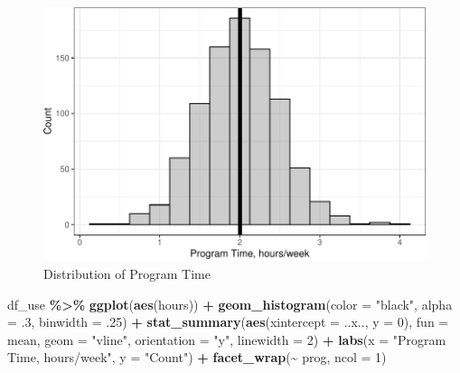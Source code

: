 \documentclass[
]{article}
\newenvironment{Shaded}{\begin{snugshade}}{\end{snugshade}}
\newcommand{\AttributeTok}[1]{\textcolor[rgb]{0.13,0.29,0.53}{#1}}
\newcommand{\DecValTok}[1]{\textcolor[rgb]{0.00,0.00,0.81}{#1}}
\newcommand{\FunctionTok}[1]{\textcolor[rgb]{0.13,0.29,0.53}{\textbf{#1}}}
\newcommand{\NormalTok}[1]{#1}
\newcommand{\SpecialCharTok}[1]{\textcolor[rgb]{0.81,0.36,0.00}{\textbf{#1}}}
\newcommand{\StringTok}[1]{\textcolor[rgb]{0.31,0.60,0.02}{#1}}
\begin{document}
\begin{figure}[hb]

\includegraphics{Appendix_ex_weightloss_files/figure-latex/unnamed-chunk-39-1} \hfill{}

\caption{Distribution of Program Time}\label{fig:unnamed-chunk-39}
\end{figure}

\clearpage

\begin{Shaded}
\begin{Highlighting}[]
\NormalTok{df\_use }\SpecialCharTok{\%\textgreater{}\%} 
  \FunctionTok{ggplot}\NormalTok{(}\FunctionTok{aes}\NormalTok{(hours)) }\SpecialCharTok{+} 
  \FunctionTok{geom\_histogram}\NormalTok{(}\AttributeTok{color =} \StringTok{"black"}\NormalTok{,}
                 \AttributeTok{alpha =}\NormalTok{ .}\DecValTok{3}\NormalTok{,}
                 \AttributeTok{binwidth =}\NormalTok{ .}\DecValTok{25}\NormalTok{) }\SpecialCharTok{+}
  \FunctionTok{stat\_summary}\NormalTok{(}\FunctionTok{aes}\NormalTok{(}\AttributeTok{xintercept =}\NormalTok{ ..x.., }\AttributeTok{y =} \DecValTok{0}\NormalTok{),}
               \AttributeTok{fun =}\NormalTok{ mean,}
               \AttributeTok{geom =} \StringTok{"vline"}\NormalTok{,}
               \AttributeTok{orientation =} \StringTok{"y"}\NormalTok{,}
               \AttributeTok{linewidth =} \DecValTok{2}\NormalTok{) }\SpecialCharTok{+}
  \FunctionTok{labs}\NormalTok{(}\AttributeTok{x =} \StringTok{"Program Time, hours/week"}\NormalTok{,}
       \AttributeTok{y =} \StringTok{"Count"}\NormalTok{) }\SpecialCharTok{+}
  \FunctionTok{facet\_wrap}\NormalTok{(}\SpecialCharTok{\textasciitilde{}}\NormalTok{ prog, }\AttributeTok{ncol =} \DecValTok{1}\NormalTok{)}
\end{Highlighting}
\end{Shaded}
\end{document}
